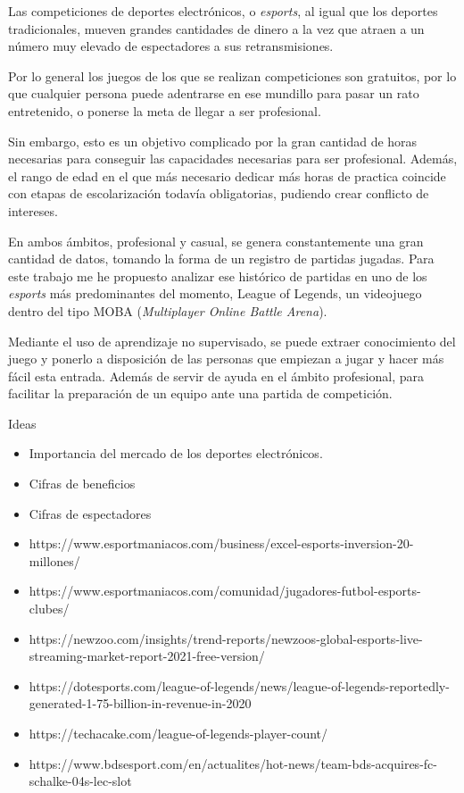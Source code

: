 
Las competiciones de deportes electrónicos, o \textit{esports}, al igual que los deportes tradicionales, mueven grandes cantidades de dinero a la vez que atraen a un número muy elevado de espectadores a sus retransmisiones.

Por lo general los juegos de los que se realizan competiciones son gratuitos, por lo que cualquier persona puede adentrarse en ese mundillo para pasar un rato entretenido, o ponerse la meta de llegar a ser profesional.

Sin embargo, esto es un objetivo complicado por la gran cantidad de horas necesarias para conseguir las capacidades necesarias para ser profesional. Además, el rango de edad en el que más necesario dedicar más horas de practica coincide con etapas de escolarización todavía obligatorias, pudiendo crear conflicto de intereses.

En ambos ámbitos, profesional y casual, se genera constantemente una gran cantidad de datos, tomando la forma de un registro de partidas jugadas. Para este trabajo me he propuesto analizar ese histórico de partidas en uno de los \textit{esports} más predominantes del momento, League of Legends, un videojuego dentro del tipo MOBA (\textit{Multiplayer Online Battle Arena}).

Mediante el uso de aprendizaje no supervisado, se puede extraer conocimiento del juego y ponerlo a disposición de las personas que empiezan a jugar y hacer más fácil esta entrada. Además de servir de ayuda en el ámbito profesional, para facilitar la preparación de un equipo ante una partida de competición.

\hfill \break
Ideas 
\begin{itemize}
    \item Importancia del mercado de los deportes electrónicos.
    \item Cifras de beneficios
    \item Cifras de espectadores
    \item https://www.esportmaniacos.com/business/excel-esports-inversion-20-millones/
    \item https://www.esportmaniacos.com/comunidad/jugadores-futbol-esports-clubes/
    \item https://newzoo.com/insights/trend-reports/newzoos-global-esports-live-streaming-market-report-2021-free-version/
    \item https://dotesports.com/league-of-legends/news/league-of-legends-reportedly-generated-1-75-billion-in-revenue-in-2020
    \item https://techacake.com/league-of-legends-player-count/
    \item https://www.bdsesport.com/en/actualites/hot-news/team-bds-acquires-fc-schalke-04s-lec-slot
\end{itemize}